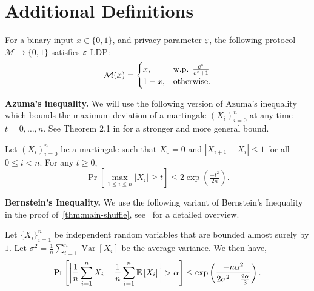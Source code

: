 \section{Additional Definitions}\label{app:add-def}
\begin{lemma}
\label{def: binary rr}
    For a binary input $x\in\{0,1\}$, and privacy parameter $\varepsilon$, the following protocol $\mathcal{M}\to \{0,1\}$ satisfies $\varepsilon$-LDP:
    \begin{equation*}
        \mathcal{M}(x)=\begin{cases}
        x,&\text{w.p. }\frac{e^\varepsilon}{e^\varepsilon +1}\\
        1-x,&\text{otherwise.}
    \end{cases}
    \end{equation*}
%
\end{lemma}
\textbf{Azuma's inequality.}
We will use the following version of Azuma's inequality which bounds the maximum deviation of a martingale $(X_i)_{i=0}^n$ at any time $t=0,\dots, n$. See Theorem 2.1 in \cite{Fan2012martingales} for a stronger and more general bound.
\begin{theorem}\label{thm:azuma} Let $(X_i)_{i=0}^n$ be a martingale such that $X_0=0$ and $|X_{i+1}-X_i|\leq 1$ for all $0\leq i<n$. For any $t\geq 0$, 
\[
\Pr[\max_{1\leq i \leq n}|X_i|\geq t]\leq 2\exp\left(\tfrac{-t^2}{2n} \right).
\]
\end{theorem}

\textbf{Bernstein's Inequality.} We use the following variant of Bernstein's Inequality in the proof of~\cref{thm:main-shuffle}, see~\citet[Proposition 2.10]{Wainwright_2019} for a detailed overview.
\begin{theorem}\label{fact: bernstein}
    Let $\{X_i\}_{i=1}^n$ be independent random variables that are bounded almost surely by $1$. Let $\sigma^2=\frac{1}{n}\sum_{i=1}^n\operatorname{Var}[X_i]$ be the average variance. We then have,
    \[
    \Pr\left[\bigg|\frac{1}{n}\sum\limits_{i=1}^n X_i-\frac{1}{n}\sum\limits_{i=1}^n\bEE{X_i}\bigg|>\acc\right]\leq\exp\left( \frac{-n\acc^2}{2\sigma^2 + \frac{2\acc}{3}} \right).
    \]
\end{theorem}